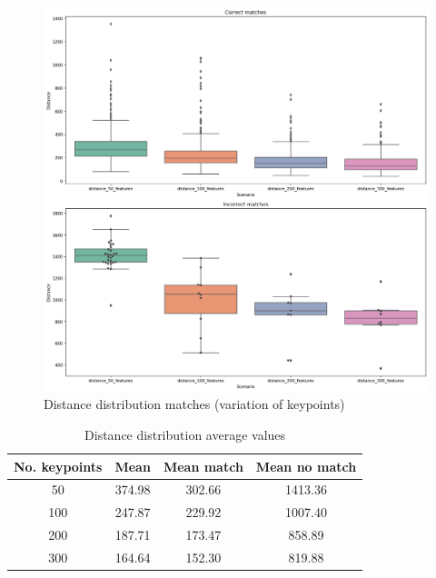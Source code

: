 
\begin{figure}[htbp]
    \includegraphics[width=1.0\columnwidth]{images/bxplt_distance_keypoints.png}
    \centering
    \caption{Distance distribution matches (variation of keypoints)}
    \label{fig:bxplt_distances_keypoints}
\end{figure}



\renewcommand{\arraystretch}{1.2}
\begin{table}[htbp]
    \caption{Distance distribution average values}
    \centering
    \begin{center}
        \begin{tabular}{ |c|c|c|c|  }
         \hline
         No. keypoints& Mean & Mean match & Mean no match\\
         \hline \hline
         50  & 374.98 & 302.66 & 1413.36\\
         \hline
         100 & 247.87 & 229.92 & 1007.40\\
         \hline
         200 & 187.71 & 173.47 & 858.89\\
         \hline
         300 & 164.64 & 152.30 & 819.88\\
         \hline
        \end{tabular}
    \end{center}
    \label{tab:keypoint_distance_mean}
\end{table}

